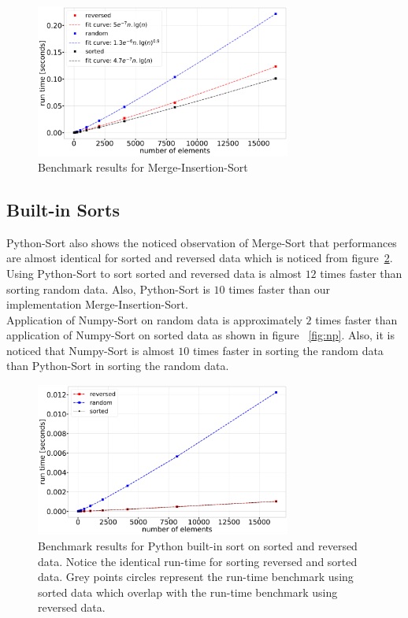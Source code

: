 \documentclass[sigconf, nonacm, natbib, screen, balance=False]{acmart}
\begin{document}
\begin{figure}
  \centering
  \includegraphics[width=84mm]{../figures/combined_sort.pdf}
  \caption{Benchmark results for Merge-Insertion-Sort}
  \label{fig:comb}
\end{figure}

\subsection{Built-in Sorts}\label{sec:builtin}
Python-Sort also shows the noticed observation of Merge-Sort that performances are almost identical for sorted and reversed data which is noticed from figure~\ref{fig:py}. Using Python-Sort to sort sorted and reversed data is almost $12$ times faster than sorting random data. Also, Python-Sort is $10$ times faster than our implementation Merge-Insertion-Sort.
\hfill\\
Application of Numpy-Sort on random data is approximately $2$ times faster than application of Numpy-Sort on sorted data as shown in figure ~\ref{fig:np}. Also, it is noticed that Numpy-Sort is almost $10$ times faster in sorting the random data than Python-Sort in sorting the random data.
\begin{figure}
  \centering
  \includegraphics[width=84mm]{../figures/py_sort.pdf}
  \caption{Benchmark results for Python built-in sort on sorted and reversed data. Notice the identical run-time for sorting reversed and sorted data. Grey points circles represent the run-time benchmark using sorted data which overlap with the run-time benchmark using reversed data.}
  \label{fig:py}
\end{figure}
\end{document}

